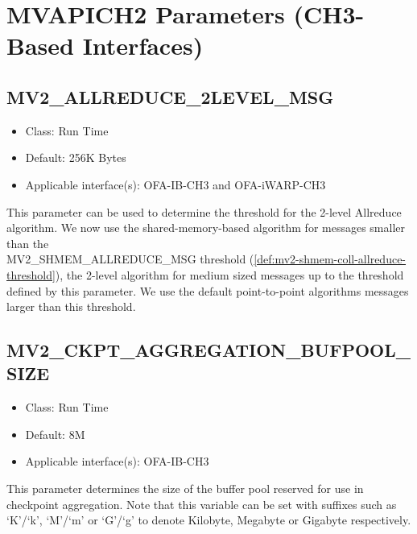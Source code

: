\section{MVAPICH2 Parameters (CH3-Based Interfaces)}
\label{def:mvapich-parameters}


\subsection{MV2\_ALLREDUCE\_2LEVEL\_MSG} 
\label{def:mv2_allreduce_2level_msg}
\begin{itemize}
    \item Class: Run Time
    \item Default: 256K Bytes
    \item Applicable interface(s):  OFA-IB-CH3 and OFA-iWARP-CH3
\end{itemize}
This parameter can be used to determine the threshold for the 
2-level Allreduce algorithm. We now use the shared-memory-based 
algorithm for messages smaller than the \\
MV2\_SHMEM\_ALLREDUCE\_MSG threshold
(\ref{def:mv2-shmem-coll-allreduce-threshold}), 
the 2-level algorithm for medium sized messages up to the threshold 
defined by this parameter. We use the default point-to-point algorithms messages
larger than this threshold. 

\subsection{MV2\_CKPT\_AGGREGATION\_BUFPOOL\_SIZE}
\label{def:mv2_ckpt_aggregation_bufpool_size}
\begin{itemize}
    \item Class: Run Time
    \item Default: 8M
    \item Applicable interface(s):  OFA-IB-CH3
\end{itemize}
This parameter determines the size of the buffer pool reserved for use in checkpoint aggregation.
Note that this variable can be set with suffixes such as `K'/`k', `M'/`m' or `G'/`g'
to denote Kilobyte, Megabyte or Gigabyte respectively.

